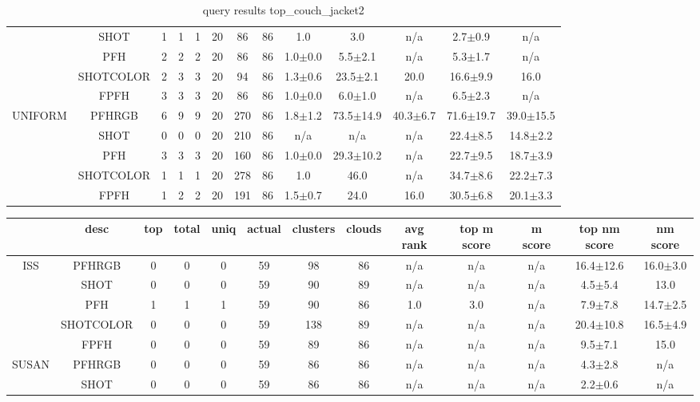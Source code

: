 \documentclass[11pt,a4paper]{kth-mag}
\begin{document}
\begin{landscape}
\begin{table}
\begin{tabular}{cc|ccccccccccc}
      &SHOT & 1 & 1 & 1 & 20 & 86 & 86 & 1.0 & 3.0 & n/a & 2.7$\pm$0.9 & n/a\\
      &PFH & 2 & 2 & 2 & 20 & 86 & 86 & 1.0$\pm$0.0 & 5.5$\pm$2.1 & n/a & 5.3$\pm$1.7 & n/a\\
      &SHOTCOLOR & 2 & 3 & 3 & 20 & 94 & 86 & 1.3$\pm$0.6 & 23.5$\pm$2.1 & 20.0 & 16.6$\pm$9.9 & 16.0\\
      &FPFH & 3 & 3 & 3 & 20 & 86 & 86 & 1.0$\pm$0.0 & 6.0$\pm$1.0 & n/a & 6.5$\pm$2.3 & n/a\\
      \hline\multirow{5}{*}{UNIFORM} & PFHRGB & 6 & 9 & 9 & 20 & 270 & 86 & 1.8$\pm$1.2 & 73.5$\pm$14.9 & 40.3$\pm$6.7 & 71.6$\pm$19.7 & 39.0$\pm$15.5\\
      &SHOT & 0 & 0 & 0 & 20 & 210 & 86 & n/a & n/a & n/a & 22.4$\pm$8.5 & 14.8$\pm$2.2\\
      &PFH & 3 & 3 & 3 & 20 & 160 & 86 & 1.0$\pm$0.0 & 29.3$\pm$10.2 & n/a & 22.7$\pm$9.5 & 18.7$\pm$3.9\\
      &SHOTCOLOR & 1 & 1 & 1 & 20 & 278 & 86 & 1.0 & 46.0 & n/a & 34.7$\pm$8.6 & 22.2$\pm$7.3\\
      &FPFH & 1 & 2 & 2 & 20 & 191 & 86 & 1.5$\pm$0.7 & 24.0 & 16.0 & 30.5$\pm$6.8 & 20.1$\pm$3.3\\
    \end{tabular}
    \caption{query results top_couch_jacket2}
    \label{tab:qtop_couch_jacket2}
  \end{table}
  \begin{table}
    \begin{tabular}{cc|ccccccccccc}
      & desc & top & total & uniq & actual & clusters & clouds & avg rank & top m score & m score & top nm score & nm score\\\hline
      \multirow{5}{*}{ISS} & PFHRGB & 0 & 0 & 0 & 59 & 98 & 86 & n/a & n/a & n/a & 16.4$\pm$12.6 & 16.0$\pm$3.0\\
      &SHOT & 0 & 0 & 0 & 59 & 90 & 89 & n/a & n/a & n/a & 4.5$\pm$5.4 & 13.0\\
      &PFH & 1 & 1 & 1 & 59 & 90 & 86 & 1.0 & 3.0 & n/a & 7.9$\pm$7.8 & 14.7$\pm$2.5\\
      &SHOTCOLOR & 0 & 0 & 0 & 59 & 138 & 89 & n/a & n/a & n/a & 20.4$\pm$10.8 & 16.5$\pm$4.9\\
      &FPFH & 0 & 0 & 0 & 59 & 89 & 86 & n/a & n/a & n/a & 9.5$\pm$7.1 & 15.0\\
      \hline\hline\multirow{5}{*}{SUSAN} & PFHRGB & 0 & 0 & 0 & 59 & 86 & 86 & n/a & n/a & n/a & 4.3$\pm$2.8 & n/a\\
      &SHOT & 0 & 0 & 0 & 59 & 86 & 86 & n/a & n/a & n/a & 2.2$\pm$0.6 & n/a\\

\end{tabular}
\end{table}
\end{landscape}
\end{document}
